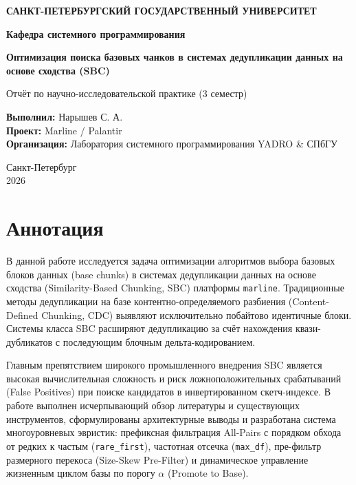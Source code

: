 \documentclass[a4paper,14pt]{extarticle}
\begin{document}
\begin{center}
    \textbf{\Large САНКТ-ПЕТЕРБУРГСКИЙ ГОСУДАРСТВЕННЫЙ УНИВЕРСИТЕТ}
    
    \vspace{0.3em}
    \textbf{\large Кафедра системного программирования}
    
    \vspace{2.5em}
    \textbf{\LARGE Оптимизация поиска базовых чанков в системах дедупликации данных на основе сходства (SBC)}
    
    \vspace{1.0em}
    \large Отчёт по научно-исследовательской практике (3 семестр)
    
    \vspace{3em}
    \begin{flushright}
        \textbf{Выполнил:} Нарышев С. А. \\
        \textbf{Проект:} Marline / Palantir \\
        \textbf{Организация:} Лаборатория системного программирования YADRO \& СПбГУ
    \end{flushright}
\end{center}

\vspace{3em}
\begin{center}
    Санкт-Петербург \\
    2026
\end{center}

\newpage

\section*{Аннотация}

В данной работе исследуется задача оптимизации алгоритмов выбора базовых блоков данных (base chunks) в системах дедупликации данных на основе сходства (Similarity-Based Chunking, SBC) платформы \texttt{marline}. Традиционные методы дедупликации на базе контентно-определяемого разбиения (Content-Defined Chunking, CDC) выявляют исключительно побайтово идентичные блоки. Системы класса SBC расширяют дедупликацию за счёт нахождения квази-дубликатов с последующим блочным дельта-кодированием. 

Главным препятствием широкого промышленного внедрения SBC является высокая вычислительная сложность и риск ложноположительных срабатываний (False Positives) при поиске кандидатов в инвертированном скетч-индексе. В работе выполнен исчерпывающий обзор литературы и существующих инструментов, сформулированы архитектурные выводы и разработана система многоуровневых эвристик: префиксная фильтрация All-Pairs с порядком обхода от редких к частым (\texttt{rare\_first}), частотная отсечка (\texttt{max\_df}), пре-фильтр размерного перекоса (Size-Skew Pre-Filter) и динамическое управление жизненным циклом базы по порогу $\alpha$ (Promote to Base).
\end{document}
